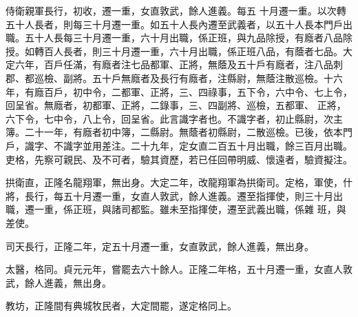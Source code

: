 \begin{pinyinscope}
 侍衛親軍長行，初收，遷一重，女直敦武，餘人進義。每五
 十月遷一重。以次轉五十人長者，則每三十月遷一重。如五十人長內遷至武義者，以五十人長本門戶出職。五十人長每三十月遷一重，六十月出職，係正班，與九品除授，有廕者八品除授。如轉百人長者，則三十月遷一重，六十月出職，係正班八品，有蔭者七品。大定六年，百戶任滿，有廕者注七品都軍、正將，無蔭及五十戶有廕者，注八品刺郡、都巡檢、副將。五十戶無廕者及長行有廕者，注縣尉，無蔭注散巡檢。十六年，有廕百戶，初中令，二都軍、正將，三、四祿事，五下令，六中令、七上令，回呈省。無廕者，初都軍、正將，二錄事，三、四副將、巡檢，五都軍、
 正將，六下令，七中令，八上令，回呈省。此言識字者也。不識字者，初止縣尉，次主簿。二十一年，有廕者初中簿，二縣尉。無蔭者初縣尉，二散巡檢。已後，依本門戶，識字、不識字並用差注。二十九年，定女直二百五十月出職，餘三百月出職。吏格，先察可親民、及不可者，驗其資歷，若已任回帶明威、懷遠者，驗資擬注。



 拱衛直，正隆名龍翔軍，無出身。大定二年，改龍翔軍為拱衛司。定格，軍使，什將，長行，每五十月遷一重，女直人敦武，餘人進義。遷至指揮使，則三十月出職，遷一重，係正班，與諸司都監。雖未至指揮使，遷至武義出職，係雜
 班，與差使。



 司天長行，正隆二年，定五十月遷一重，女直敦武，餘人進義，無出身。



 太醫，格同。貞元元年，嘗罷去六十餘人。正隆二年格，五十月遷一重，女直人敦武，餘人進義，無出身。



 教坊，正隆間有典城牧民者，大定間罷，遂定格同上。



\end{pinyinscope}